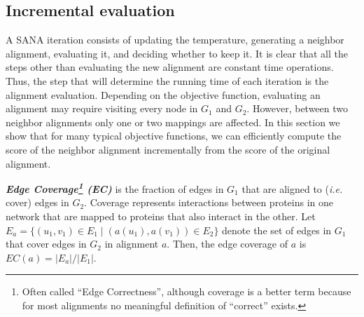\documentclass{bioinfo}
\begin{document}
\begin{methods}


\subsection{Incremental evaluation}\label{implementation}

A SANA iteration consists of updating the temperature, generating a neighbor alignment, evaluating it, and deciding whether to keep it. It is clear that all the steps other than evaluating the new alignment are constant time operations. Thus, the step that will determine the running time of each iteration is the alignment evaluation. Depending on the objective function, evaluating an alignment may require visiting every node in $G_1$ and $G_2$. However, between two neighbor alignments only one or two mappings are affected. In this section we show that for many typical objective functions, we can efficiently compute the score of the neighbor alignment incrementally from the score of the original alignment.

\emph{\textbf{Edge Coverage\footnote{Often called ``Edge Correctness'', although coverage is a better term because for most alignments no meaningful definition of ``correct'' exists.} (EC)}} is the fraction of edges in $G_1$ that are aligned to ({\it i.e.} cover) edges in $G_2$. Coverage represents interactions between proteins in one network that are mapped to proteins that also interact in the other. Let $E_a=\{(u_1,v_1)\in E_1\mid (a(u_1),a(v_1))\in E_2\}$ denote the set of edges in $G_1$ that cover edges in $G_2$ in alignment $a$. Then, the edge coverage of $a$ is $EC(a)={|E_a|}/{|E_1|}$. 


\end{methods}
\end{document}
